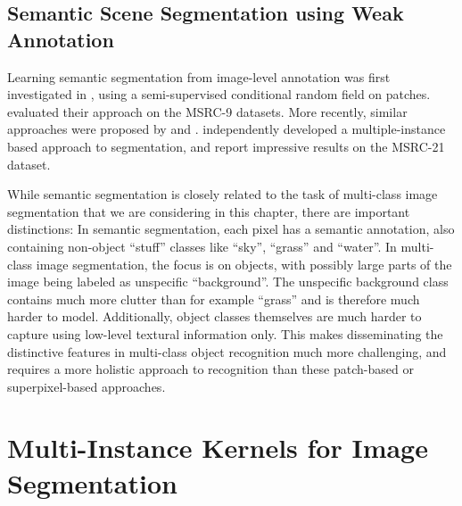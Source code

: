 

\subsection{Semantic Scene Segmentation using Weak Annotation}
Learning semantic segmentation from image-level annotation was first investigated in \citet{verbeek2007region},
using a semi-supervised conditional random field on patches. \citet{verbeek2007region} evaluated their approach
on the MSRC-9 datasets.
More recently, similar approaches were proposed by
\citet{vezhnevets2011weakly} and \citet{vezhnevets2010towards}.
\citet{vezhnevets2011weakly} independently developed a multiple-instance based
approach to segmentation, and report impressive results on the MSRC-21 dataset.

While semantic segmentation is closely related to the task of multi-class image
segmentation that we are considering in this chapter, there are important
distinctions: In semantic segmentation, each pixel has a semantic annotation,
also containing non-object ``stuff'' classes like ``sky'', ``grass'' and
``water''. In multi-class image segmentation, the focus is on objects, with
possibly large parts of the image being labeled as unspecific ``background''.
The unspecific background class contains much more clutter than for example
``grass'' and is therefore much harder to model. Additionally, object classes
themselves are much harder to capture using low-level textural information
only.  This makes disseminating the distinctive features in multi-class object
recognition much more challenging, and requires a more holistic approach to
recognition than these patch-based or superpixel-based approaches.


\section{Multi-Instance Kernels for Image Segmentation}
